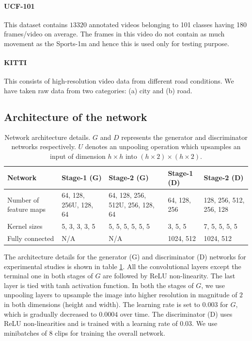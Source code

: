 \documentclass{article}
\begin{document}
  \paragraph{UCF-101} This dataset contains $ 13320 $ annotated videos belonging to 101 classes having 180 frames/video on average. The frames in this video do not contain as much movement as the Sports-1m and hence this is used only for testing purpose.
  \paragraph{KITTI} This consists of high-resolution video data from different road conditions. We have taken raw data from two categories: (a) city and (b) road.

\subsection{Architecture of the network}

  \begin{table}[!htbp]
  	\caption{Network architecture details. $ G $ and $ D $ represents the generator and discriminator networks respectively. $ U $ denotes an unpooling operation which upsamples an input of dimension $ h \times h $ into $ (h \times 2) \times (h \times 2) $.}
  	\centering
  	\begin{tabular}{p{2.3cm}p{3cm}p{2.5cm}p{2cm}p{2cm}}
  		\hline
  		Network & Stage-1 (G) & Stage-2 (G) & Stage-1 (D) & Stage-2 (D)\\
  		\hline
  		Number of feature maps & 64, 128, 256U, 128, 64 & 64, 128, 256, 512U, 256, 128, 64 & 64, 128, 256 & 128, 256, 512, 256, 128 \\
  		\hline
  		Kernel sizes & 5, 3, 3, 3, 5 & 5, 5, 5, 5, 5, 5 & 3, 5, 5  & 7, 5, 5, 5, 5  \\
  		\hline
  		Fully connected & N/A & N/A & 1024, 512 & 1024, 512 \\
  		\hline
  	\end{tabular}
  	\label{tab:arch}
  \end{table}

The architecture details for the generator (G) and discriminator (D) networks for experimental studies is shown in table \ref{tab:arch}. All the convolutional layers except the terminal one in both stages of $ G $ are followed by ReLU non-linearity. The last layer is tied with tanh activation function. In both the stages of $ G $, we use unpooling layers to upsample the image into higher resolution in magnitude of $ 2 $ in both dimensions (height and width). The learning rate is set to $ 0.003 $ for $ G $, which is gradually decreased to $ 0.0004 $ over time. The discriminator (D) uses ReLU non-linearities and is trained with a learning rate of $ 0.03 $. We use minibatches of 8 clips for training the overall network.
\end{document}
